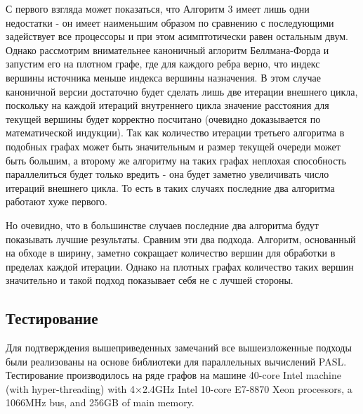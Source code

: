 С первого взгляда может показаться, что Алгоритм 3 имеет лишь одни недостатки - он имеет наименьшим образом по сравнению с последующими задействует все процессоры и при этом асимптотически равен остальным двум. Однако рассмотрим внимательнее каноничный аглоритм Беллмана-Форда и запустим его на плотном графе, где для каждого ребра верно, что индекс вершины источника меньше индекса вершины назначения. В этом случае каноничной версии достаточно будет сделать лишь две итерации внешнего цикла, поскольку на каждой итераций внутреннего цикла значение расстояния для текущей вершины будет корректно посчитано (очевидно доказывается по математической индукции). Так как количество итерации третьего алгоритма в подобных графах может быть значительным и размер текущей очереди может быть большим, а второму же алгоритму на таких графах неплохая способность параллелиться будет только вредить - она будет заметно увеличивать число итераций внешнего цикла. То есть в таких случаях последние два алгоритма работают хуже первого.   

Но очевидно, что в большинстве случаев последние два алгоритма будут показывать лучшие результаты. Сравним эти два подхода. Алгоритм, основанный на обходе в ширину, заметно сокращает количество вершин для обработки в пределах каждой итерации. Однако на плотных графах количество таких вершин значительно и такой подход показывает себя не с лучшей стороны. 

\FloatBarrier
\subsection{Тестирование}

Для подтверждения вышеприведенных замечаний все вышеизложенные подходы были реализованы на основе библиотеки для параллельных вычислений PASL. Тестирование производилось на ряде графов на машине 40-core Intel machine (with hyper-threading) with 4×2.4GHz Intel
10-core E7-8870 Xeon processors, a 1066MHz bus, and 256GB of
main memory. 

